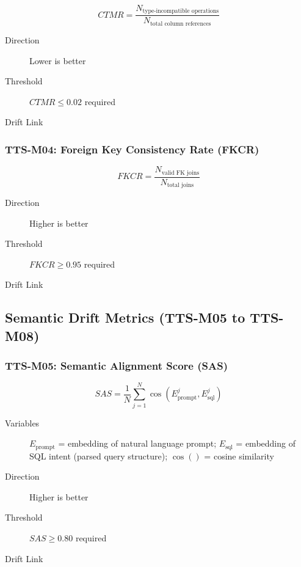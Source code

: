 \begin{equation}
\boxed{
CTMR = \frac{N_{\text{type-incompatible operations}}}{N_{\text{total column references}}}
}
\end{equation}

\begin{description}
  \item[Direction] Lower is better
  \item[Threshold] $CTMR \leq 0.02$ required
  \item[Drift Link] 
\end{description}

\subsubsection{TTS-M04: Foreign Key Consistency Rate (FKCR)}

\begin{equation}
\boxed{
FKCR = \frac{N_{\text{valid FK joins}}}{N_{\text{total joins}}}
}
\end{equation}

\begin{description}
  \item[Direction] Higher is better
  \item[Threshold] $FKCR \geq 0.95$ required
  \item[Drift Link] 
\end{description}

\subsection{Semantic Drift Metrics (TTS-M05 to TTS-M08)}

\subsubsection{TTS-M05: Semantic Alignment Score (SAS)}

\begin{equation}
\boxed{
SAS = \frac{1}{N} \sum_{j=1}^{N} \cos(E_{\text{prompt}}^j, E_{\text{sql}}^j)
}
\end{equation}

\begin{description}
  \item[Variables] $E_{\text{prompt}}$ = embedding of natural language prompt;
        $E_{\text{sql}}$ = embedding of SQL intent (parsed query structure);
        $\cos()$ = cosine similarity
  \item[Direction] Higher is better
  \item[Threshold] $SAS \geq 0.80$ required
  \item[Drift Link] 
\end{description}


